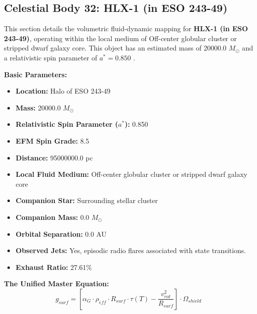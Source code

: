 \documentclass[11pt, a4paper]{article}
\begin{document}
\clearpage
\subsection{Celestial Body 32: HLX-1 (in ESO 243-49)}
This section details the volumetric fluid-dynamic mapping for \textbf{HLX-1 (in ESO 243-49)}, operating within the local medium of Off-center globular cluster or stripped dwarf galaxy core. This object has an estimated mass of 20000.0 $M_{\odot}$ and a relativistic spin parameter of $a^* = 0.850$ \cite{farrell2009, ned}.

\vspace{0.5em}
\noindent \textbf{Basic Parameters:}
\begin{itemize}
  \item \textbf{Location:} Halo of ESO 243-49
  \item \textbf{Mass:} 20000.0 $M_{\odot}$
  \item \textbf{Relativistic Spin Parameter ($a^*$):} 0.850
  \item \textbf{EFM Spin Grade:} 8.5
  \item \textbf{Distance:} 95000000.0 pc
  \item \textbf{Local Fluid Medium:} Off-center globular cluster or stripped dwarf galaxy core
  \item \textbf{Companion Star:} Surrounding stellar cluster
  \item \textbf{Companion Mass:} 0.0 $M_{\odot}$
  \item \textbf{Orbital Separation:} 0.0 AU
  \item \textbf{Observed Jets:} Yes, episodic radio flares associated with state transitions.
  \item \textbf{Exhaust Ratio:} 27.61\%
\end{itemize}

\vspace{0.5em}
\noindent \textbf{The Unified Master Equation:}
$$ g_{surf} = \left[ \alpha_G \cdot \rho_{eff} \cdot R_{surf} \cdot \tau(T) - \frac{v_{rot}^2}{R_{surf}} \right] \cdot \Omega_{shield} $$
\end{document}
